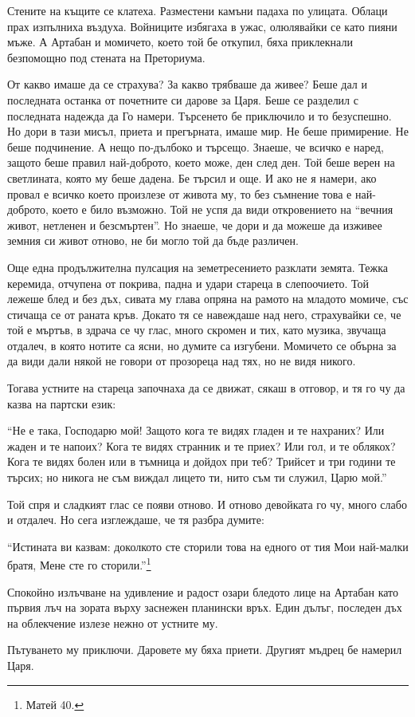 \documentclass[oneside,10pt]{memoir}
\begin{document}
Стените на къщите се клатеха. Разместени камъни падаха по улицата. Облаци прах
изпълниха въздуха. Войниците избягаха в ужас, олюлявайки се като пияни мъже. А
Артабан и момичето, което той бе откупил, бяха приклекнали безпомощно под
стената на Преториума.

От какво имаше да се страхува? За какво трябваше да живее? Беше дал и последната
останка от почетните си дарове за Царя. Беше се разделил с последната надежда да
Го намери. Търсенето бе приключило и то безуспешно. Но дори в тази мисъл, приета
и прегърната, имаше мир. Не беше примирение. Не беше подчинение. А нещо
по-дълбоко и търсещо. Знаеше, че всичко е наред, защото беше правил най-доброто,
което може, ден след ден. Той беше верен на светлината, която му беше дадена. Бе
търсил и още. И ако не я намери, ако провал е всичко което произлезе от живота
му, то без съмнение това е най-доброто, което е било възможно. Той не успя да
види откровението на ``вечния живот, нетленен и безсмъртен''. Но знаеше, че дори
и да можеше да изживее земния си живот отново, не би могло той да бъде различен.

Още една продължителна пулсация на земетресението разклати земята. Тежка
керемида, отчупена от покрива, падна и удари стареца в слепоочието. Той лежеше
блед и без дъх, сивата му глава опряна на рамото на младото момиче, със стичаща
се от раната кръв. Докато тя се навеждаше над него, страхувайки се, че той е
мъртъв, в здрача се чу глас, много скромен и тих, като музика, звучаща отдалеч,
в която нотите са ясни, но думите са изгубени. Момичето се обърна за да види
дали някой не говори от прозореца над тях, но не видя никого.

Тогава устните на стареца започнаха да се движат, сякаш в отговор, и тя го чу да
казва на партски език:

``Не е така, Господарю мой! Защото кога те видях гладен и те нахраних? Или жаден
и те напоих? Кога те видях странник и те приех? Или гол, и те облякох? Кога те
видях болен или в тъмница и дойдох при теб? Трийсет и три години те търсих; но
никога не съм виждал лицето ти, нито съм ти служил, Царю мой.''

Той спря и сладкият глас се появи отново. И отново девойката го чу, много слабо
и отдалеч. Но сега изглеждаше, че тя разбра думите:

``Истината ви казвам: доколкото сте сторили това на едного от тия Мои най-малки братя,
Мене сте го сторили.''\footnote{Матей 40.}

Спокойно излъчване на удивление и радост озари бледото лице на Артабан като
първия лъч на зората върху заснежен планински връх. Един дълъг, последен дъх на
облекчение излезе нежно от устните му.

Пътуването му приключи. Даровете му бяха приети. Другият мъдрец бе намерил Царя.
\end{document}

